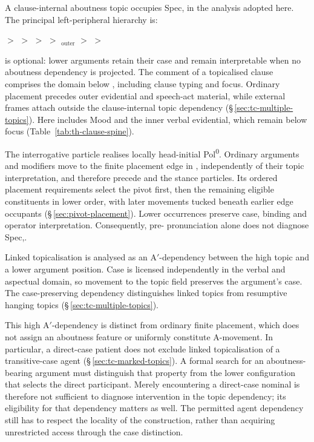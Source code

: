 A clause-internal aboutness topic occupies Spec, in the
 analysis adopted here. The principal left-peripheral hierarchy is:

\begin{center}
 $>$  $>$  $>$
 $>$ $_{\mathrm{outer}}$ $>$
 $>$ 
\end{center}

\noindent {} is optional: lower arguments retain their case and
 remain interpretable when no aboutness dependency is projected. The comment
 of a topicalised clause comprises the domain below , including
 clause typing and focus. Ordinary placement precedes outer evidential and speech-act material,
 while external frames attach outside the clause-internal topic
 dependency (§\,\ref{sec:tc-multiple-topics}). Here  includes
 Mood and the inner verbal evidential, which remain below focus
 (Table~\ref{tab:th-clause-spine}).

The interrogative particle  realises locally head-initial
 Pol\textsuperscript{0}. Ordinary arguments and modifiers move to the
 finite placement edge in , independently of their topic
 interpretation, and therefore precede  and the stance particles.
 Its ordered placement requirements select the pivot first, then the remaining
 eligible constituents in lower order, with later movements tucked beneath
 earlier edge occupants (§\,\ref{sec:pivot-placement}). Lower occurrences
 preserve case, binding and operator interpretation. Consequently,
 pre- pronunciation alone does not diagnose Spec,.

Linked topicalisation is analysed as an A$'$-dependency between the high
 topic and a lower argument position. Case is licensed independently in the
 verbal and aspectual domain, so movement to the topic field preserves the
 argument's case. The case-preserving dependency distinguishes linked topics from resumptive
 hanging topics (§\,\ref{sec:tc-multiple-topics}).

This high A$'$-dependency is distinct from ordinary finite placement,
 which does not assign an aboutness feature or uniformly constitute A-movement. In particular, a direct-case
 patient does not exclude linked topicalisation of a transitive-case agent
 (§\,\ref{sec:tc-marked-topics}). A formal search for an aboutness-bearing
 argument must distinguish that property from the lower configuration that
 selects the direct participant. Merely encountering a direct-case nominal
 is therefore not sufficient to diagnose intervention in the topic dependency;
 its eligibility for that dependency matters as well. The permitted agent
 dependency still has to respect the locality of the construction, rather
 than acquiring unrestricted access through the case distinction.

